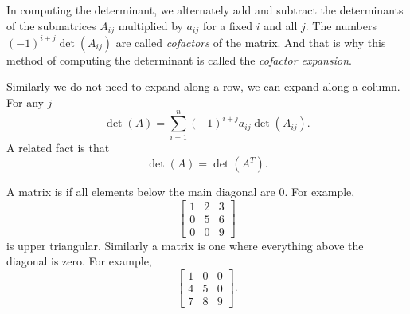 In computing the determinant,
we alternately add and subtract the determinants of the submatrices
$A_{ij}$ multiplied by $a_{ij}$ for a fixed $i$ and all $j$.
The numbers ${(-1)}^{i+j}\det(A_{ij})$ are called
\emph{cofactors}
of the matrix.  And that is why
this method of computing the determinant is called the
\emph{cofactor expansion}.

Similarly we do not need to expand along a row, we can expand
along a column.  For any $j$
\begin{equation*}
\det (A)
=
\sum_{i=1}^n
{(-1)}^{i+j}
a_{ij} \det (A_{ij}) .
\end{equation*}
A related fact is that
\begin{equation*}
\det (A) = \det (A^T) .
\end{equation*}

\medskip

A matrix is \emph{} if all elements below
the main diagonal are 0.  For example,
\begin{equation*}
\begin{bmatrix}
1 & 2 & 3 \\
0 & 5 & 6 \\
0 & 0 & 9
\end{bmatrix}
\end{equation*}
is upper triangular.  Similarly a \emph{}
matrix is one where everything above the diagonal is zero.  For example,
\begin{equation*}
\begin{bmatrix}
1 & 0 & 0 \\
4 & 5 & 0 \\
7 & 8 & 9
\end{bmatrix} .
\end{equation*}

